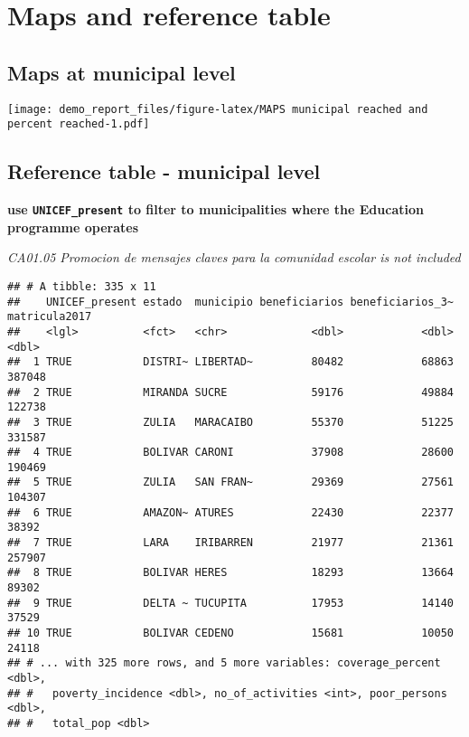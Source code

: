 \documentclass[
]{article}
\begin{document}
\hypertarget{maps-and-reference-table}{%
\section{Maps and reference table}\label{maps-and-reference-table}}

\hypertarget{maps-at-municipal-level}{%
\subsection{Maps at municipal level}\label{maps-at-municipal-level}}

\texttt{[image: demo\_report\_files/figure-latex/MAPS municipal reached and percent reached-1.pdf]}

\hypertarget{reference-table---municipal-level}{%
\subsection{Reference table - municipal
level}\label{reference-table---municipal-level}}

\textbf{use \texttt{UNICEF\_present} to filter to municipalities where
the Education programme operates}

\emph{CA01.05 Promocion de mensajes claves para la comunidad escolar is
not included}

\begin{verbatim}
## # A tibble: 335 x 11
##    UNICEF_present estado  municipio beneficiarios beneficiarios_3~ matricula2017
##    <lgl>          <fct>   <chr>             <dbl>            <dbl>         <dbl>
##  1 TRUE           DISTRI~ LIBERTAD~         80482            68863        387048
##  2 TRUE           MIRANDA SUCRE             59176            49884        122738
##  3 TRUE           ZULIA   MARACAIBO         55370            51225        331587
##  4 TRUE           BOLIVAR CARONI            37908            28600        190469
##  5 TRUE           ZULIA   SAN FRAN~         29369            27561        104307
##  6 TRUE           AMAZON~ ATURES            22430            22377         38392
##  7 TRUE           LARA    IRIBARREN         21977            21361        257907
##  8 TRUE           BOLIVAR HERES             18293            13664         89302
##  9 TRUE           DELTA ~ TUCUPITA          17953            14140         37529
## 10 TRUE           BOLIVAR CEDENO            15681            10050         24118
## # ... with 325 more rows, and 5 more variables: coverage_percent <dbl>,
## #   poverty_incidence <dbl>, no_of_activities <int>, poor_persons <dbl>,
## #   total_pop <dbl>
\end{verbatim}
\end{document}
